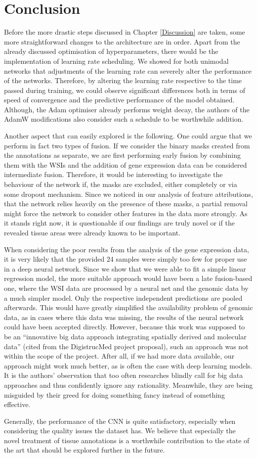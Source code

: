 \chapter{Conclusion} 
    \label{conclusion}

Before the more drastic steps discussed in Chapter \ref{Discussion} are taken, some more straightforward changes to the architecture are in order. Apart from the already discussed optimisation of hyperparameters, there would be the implementation of learning rate scheduling. We showed for both unimodal networks that adjustments of the learning rate can severely alter the performance of the networks. Therefore, by altering the learning rate respective to the time passed during training, we could observe significant differences both in terms of speed of convergence and the predictive performance of the model obtained. Although, the Adam optimiser already performs weight decay, the authors of the AdamW modifications also consider such a schedule to be worthwhile addition. \cite{Loshchilov2017Decoupled}

Another aspect that can easily explored is the following. One could argue that we perform in fact two types of fusion. If we consider the binary masks created from the annotations as separate, we are first performing early fusion by combining them with the WSIs and the addition of gene expression data can be considered intermediate fusion. Therefore, it would be interesting to investigate the behaviour of the network if, the masks are excluded, either completely or via some dropout mechanism. Since we noticed in our analysis of feature attributions, that the network relies heavily on the presence of these masks, a partial removal might force the network to consider other features in the data more strongly. As it stands right now, it is questionable if our findings are truly novel or if the revealed tissue areas were already known to be important. 

When considering the poor results from the analysis of the gene expression data, it is very likely that the provided 24 samples were simply too few for proper use in a deep neural network. Since we show that we were able to fit a simple linear regression model, the more suitable approach would have been a late fusion-based one, where the WSI data are processed by a neural net and the genomic data by a much simpler model. Only the respective independent predictions are pooled afterwards. This would have greatly simplified the availability problem of genomic data, as in cases where this data was missing, the results of the neural network could have been accepted directly.
However, because this work was supposed to be an “innovative big data approach integrating spatially derived and molecular data” (cited from the DigistrucMed project proposal), such an approach was not within the scope of the project. After all, if we had more data available, our approach might work much better, as is often the case with deep learning models.
It is the authors' observation that too often researches blindly call for big data approaches and thus confidently ignore any rationality. Meanwhile, they are being misguided by their greed for doing something fancy instead of something effective.

Generally, the performance of the CNN is quite satisfactory, especially when considering the quality issues the dataset has. We believe that especially the novel treatment of tissue annotations is a worthwhile contribution to the state of the art that should be explored further in the future. 

